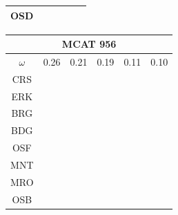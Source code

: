 \documentclass[12pt]{article}
\begin{document}
\begin{landscape}
\begin{figure}
\begin{minipage}[c]{0.3\textwidth}
\begin{tabular}{|c|c|c|c|c|c|}
        OSD&\cellcolor[HTML]{FF7F00}&\cellcolor[HTML]{984EA3}&\cellcolor[HTML]{984EA3}&\cellcolor[HTML]{FF7F00}&\cellcolor[HTML]{FF7F00}\\ \hline %
\end{tabular}
\end{minipage}
\begin{minipage}[c]{0.3\textwidth}
\begin{tabular}{|c|c|c|c|c|c|}%
         \hline \multicolumn{6}{|c|}{MCAT 956} \\ \hline
         $\omega$&0.26&0.21&0.19&0.11&0.10\\ \hline %
        CRS&\cellcolor[HTML]{E41A1C}&\cellcolor[HTML]{E41A1C}&\cellcolor[HTML]{E41A1C}&\cellcolor[HTML]{E41A1C}&\cellcolor[HTML]{E41A1C}\\ \hline %
        ERK&\cellcolor[HTML]{E41A1C}&\cellcolor[HTML]{377EB8}&\cellcolor[HTML]{E41A1C}&\cellcolor[HTML]{377EB8}&\cellcolor[HTML]{E41A1C}\\ \hline %
        BRG&\cellcolor[HTML]{377EB8}&\cellcolor[HTML]{4DAF4A}&\cellcolor[HTML]{377EB8}&\cellcolor[HTML]{4DAF4A}&\cellcolor[HTML]{377EB8}\\ \hline %
        BDG&\cellcolor[HTML]{377EB8}&\cellcolor[HTML]{4DAF4A}&\cellcolor[HTML]{377EB8}&\cellcolor[HTML]{4DAF4A}&\cellcolor[HTML]{377EB8}\\ \hline %
        OSF&\cellcolor[HTML]{4DAF4A}&\cellcolor[HTML]{4DAF4A}&\cellcolor[HTML]{377EB8}&\cellcolor[HTML]{4DAF4A}&\cellcolor[HTML]{377EB8}\\ \hline %
        MNT&\cellcolor[HTML]{4DAF4A}&\cellcolor[HTML]{984EA3}&\cellcolor[HTML]{4DAF4A}&\cellcolor[HTML]{984EA3}&\cellcolor[HTML]{4DAF4A}\\ \hline %
        MRO&\cellcolor[HTML]{4DAF4A}&\cellcolor[HTML]{984EA3}&\cellcolor[HTML]{4DAF4A}&\cellcolor[HTML]{984EA3}&\cellcolor[HTML]{4DAF4A}\\ \hline %
        OSB&\cellcolor[HTML]{984EA3}&\cellcolor[HTML]{984EA3}&\cellcolor[HTML]{4DAF4A}&\cellcolor[HTML]{FF7F00}&\cellcolor[HTML]{984EA3}\\ \hline %

\end{tabular}
\end{minipage}
\end{figure}
\end{landscape}
\end{document}
